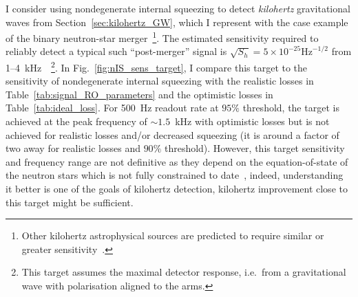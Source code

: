 I consider using nondegenerate internal squeezing to detect \emph{kilohertz} gravitational waves from Section~\ref{sec:kilohertz_GW}, which I represent with the case example of the binary neutron-star merger~\footnote{Other kilohertz astrophysical sources are predicted to require similar or greater sensitivity~\cite{miaoDesignGravitationalWaveDetectors2018}.}. The estimated sensitivity required to reliably detect a typical such ``post-merger'' signal is $\sqrt{S_h}=5\times10^{-25} \mathrm{Hz}^{-1/2}$ from 1--4~kHz~\cite{miaoDesignGravitationalWaveDetectors2018}~\footnote{This target assumes the maximal detector response, i.e.\ from a gravitational wave with polarisation aligned to the arms.}.
In Fig.~\ref{fig:nIS_sens_target}, I compare this target to the sensitivity of nondegenerate internal squeezing with the realistic losses in Table~\ref{tab:signal_RO_parameters} and the optimistic losses in Table~\ref{tab:ideal_loss}. 
For 500~Hz readout rate at $95\%$ threshold, the target is achieved at the peak frequency of $\sim1.5$~kHz with optimistic losses but is not achieved for realistic losses and/or decreased squeezing (it is around a factor of two away for realistic losses and $90\%$ threshold). %
However, this target sensitivity and frequency range are not definitive as they depend on the equation-of-state of the neutron stars which is not fully constrained to date~\cite{PhysRevD.100.104029,miaoDesignGravitationalWaveDetectors2018}, indeed, understanding it better is one of the goals of kilohertz detection, kilohertz improvement close to this target might be sufficient.
